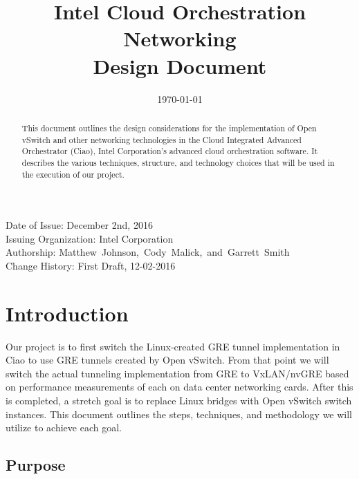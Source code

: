 \documentclass[10pt,onecolumn,journal,draftclsnofoot]{IEEEtran}
\begin{document}
\begin{titlepage}
	\title{Intel Cloud Orchestration Networking\\ Design Document}
	\date{\today}
	\maketitle
	\vspace{4cm}
	\begin{abstract}
		\noindent This document outlines the design considerations for
		the implementation of Open vSwitch and other networking
		technologies in the Cloud Integrated Advanced Orchestrator
		(Ciao), Intel Corporation's advanced cloud orchestration
		software. It describes the various techniques, structure, and
		technology choices that will be used in the execution of our
		project.
	\end{abstract}
	\vspace{6cm}
	\begin{center}
		Date of Issue: December 2nd, 2016\\
		Issuing Organization: Intel Corporation\\
		Authorship: Matthew~Johnson,~Cody~Malick,~and~Garrett~Smith\\
		Change History: First Draft, 12-02-2016 \\
	\end{center}

\end{titlepage}
\tableofcontents
\clearpage

\section{Introduction}

Our project is to first switch the Linux-created GRE tunnel implementation in
Ciao to use GRE tunnels created by Open vSwitch. From that point we will switch
the actual tunneling implementation from GRE to VxLAN/nvGRE based on performance
measurements of each on data center networking cards. After this is completed, a
stretch goal is to replace Linux bridges with Open vSwitch switch instances.
This document outlines the steps, techniques, and methodology we will utilize to
achieve each goal.

\subsection{Purpose}
\end{document}
